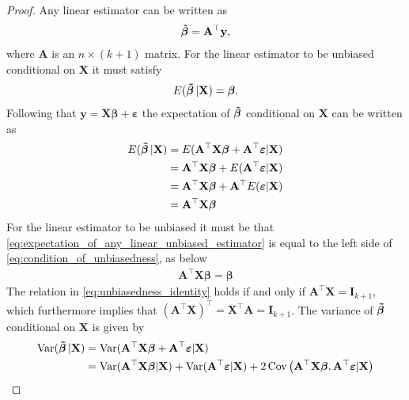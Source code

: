 \begin{proof}
    Any linear estimator can be written as
    \begin{align}\label{eq:any_linear_operator}
        \boldsymbol{\Tilde{\beta}} = \mathbf{A}^\top \mathbf{y},
    \end{align}
    where $\mathbf{A}$ is an $n \times (k + 1)$ matrix.
    For the linear estimator to be unbiased conditional on $\mathbf{X}$ it must satisfy
    \begin{align}\label{eq:condition_of_unbiasedness}
        E(\operatorname{\boldsymbol{\Tilde{\beta}}}|\mathbf{X}) = \boldsymbol{\beta}.
    \end{align}
    Following that $\mathbf{y} = \mathbf{X}\boldsymbol{\beta} + \boldsymbol{\varepsilon}$ the expectation of $\operatorname{\boldsymbol{\Tilde{\beta}}}$ conditional on $\mathbf{X}$ can be written as
    \begin{align}
       E(\operatorname{\boldsymbol{\Tilde{\beta}}}|\mathbf{X}) &= E( \mathbf{A}^\top\mathbf{X}\boldsymbol{\beta} + \mathbf{A}^\top\boldsymbol{\varepsilon}|\mathbf{X} )\nonumber \\
        &=  \mathbf{A}^\top\mathbf{X}\boldsymbol{\beta} + E( \mathbf{A}^\top\boldsymbol{\varepsilon}|\mathbf{X} )\nonumber \\
        &=\mathbf{A}^\top\mathbf{X}\boldsymbol{\beta} +  \mathbf{A}^\top E( \boldsymbol{\varepsilon}|\mathbf{X} )\nonumber \\
        &=\mathbf{A}^\top\mathbf{X}\boldsymbol{\beta}\label{eq:expectation_of_any_linear_unbiased_estimator}
    \end{align}
    For the linear estimator to be unbiased it must be that \eqref{eq:expectation_of_any_linear_unbiased_estimator} is equal to the left side of \eqref{eq:condition_of_unbiasedness}, as below
    \begin{align}\label{eq:unbiasedness_identity}
        \mathbf{A}^\top\mathbf{X}\boldsymbol{\beta} = \boldsymbol{\beta}
    \end{align}
    The relation in \eqref{eq:unbiasedness_identity} holds if and only if $\mathbf{A}^\top\mathbf{X} = \mathbf{I}_{k + 1}$, which furthermore implies that $(\mathbf{A}^\top\mathbf{X})^\top = \mathbf{X}^\top\mathbf{A} = \mathbf{I}_{k + 1}$.
    The variance of $\operatorname{\boldsymbol{\Tilde{\beta}}}$ conditional on $\mathbf{X}$ is given by
    \begin{align}
        \var(\betatilde|\mathbf{X}) &= \var(\mathbf{A}^\top\mathbf{X}\boldsymbol{\beta} + \mathbf{A}^\top\boldsymbol{\varepsilon}|\mathbf{X}) \nonumber\\
        &= \var(\mathbf{A}^\top\mathbf{X}\boldsymbol{\beta}|\mathbf{X}) + \var(\mathbf{A}^\top\boldsymbol{\varepsilon}|\mathbf{X}) + 2 \cov\left(\mathbf{A}^\top\mathbf{X}\boldsymbol{\beta},\mathbf{A}^\top\boldsymbol{\varepsilon}|\mathbf{X}\right) \nonumber\\

\end{align}
\end{proof}
